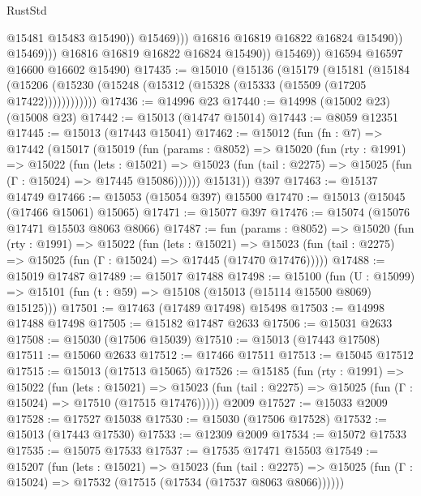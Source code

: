 \begin{lexlean}{RustStd}
\begin{coremodule}
                                  @15481
                                  @15483
                                  @15490))
                              @15469)))
                        @16816
                        @16819
                        @16822
                        @16824
                        @15490))
                    @15469)))
              @16816
              @16819
              @16822
              @16824
              @15490))
          @15469))
      @16594
      @16597
      @16600
      @16602
      @15490)
@17435 := @15010
    (@15136
      (@15179
        (@15181
          (@15184 (@15206 (@15230 (@15248 (@15312 (@15328 (@15333 (@15509 (@17205 @17422))))))))))))
@17436 := @14996 @23
@17440 := @14998 (@15002 @23) (@15008 @23)
@17442 := @15013 (@14747 @15014)
@17443 := @8059 @12351
@17445 := @15013 (@17443 @15041)
@17462 := @15012
    (fun (fn : @7) =>
    @17442
      (@15017
        (@15019
          (fun (params : @8052) =>
          @15020
            (fun (rty : @1991) =>
            @15022
              (fun (lets : @15021) =>
              @15023 (fun (tail : @2275) => @15025 (fun (Γ : @15024) => @17445 @15086))))))
        @15131))
    @397
@17463 := @15137 @14749
@17466 := @15053 (@15054 @397) @15500
@17470 := @15013 (@15045 (@17466 @15061) @15065)
@17471 := @15077 @397
@17476 := @15074 (@15076 @17471 @15503 @8063 @8066)
@17487 := fun (params : @8052) =>
  @15020
    (fun (rty : @1991) =>
    @15022
      (fun (lets : @15021) =>
      @15023 (fun (tail : @2275) => @15025 (fun (Γ : @15024) => @17445 (@17470 @17476)))))
@17488 := @15019 @17487
@17489 := @15017 @17488
@17498 := @15100
    (fun (U : @15099) => @15101 (fun (t : @59) => @15108 (@15013 (@15114 @15500 @8069) @15125)))
@17501 := @17463 (@17489 @17498) @15498
@17503 := @14998 @17488 @17498
@17505 := @15182 @17487 @2633
@17506 := @15031 @2633
@17508 := @15030 (@17506 @15039)
@17510 := @15013 (@17443 @17508)
@17511 := @15060 @2633
@17512 := @17466 @17511
@17513 := @15045 @17512
@17515 := @15013 (@17513 @15065)
@17526 := @15185
    (fun (rty : @1991) =>
    @15022
      (fun (lets : @15021) =>
      @15023 (fun (tail : @2275) => @15025 (fun (Γ : @15024) => @17510 (@17515 @17476)))))
    @2009
@17527 := @15033 @2009
@17528 := @17527 @15038
@17530 := @15030 (@17506 @17528)
@17532 := @15013 (@17443 @17530)
@17533 := @12309 @2009
@17534 := @15072 @17533
@17535 := @15075 @17533
@17537 := @17535 @17471 @15503
@17549 := @15207
    (fun (lets : @15021) =>
    @15023
      (fun (tail : @2275) =>
      @15025 (fun (Γ : @15024) => @17532 (@17515 (@17534 (@17537 @8063 @8066))))))

\end{coremodule}
\end{lexlean}
